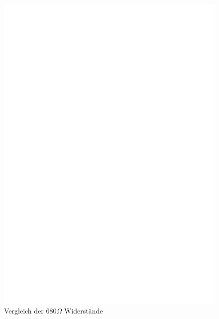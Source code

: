 \begin{enumerate}
\begin{figure}[H]
\centering
\includegraphics[width=17cm]{../FIG/Test2.eps}
\caption{Vergleich der \(680\Omega\) Widerst\"ande }
\label{fig:test2}
\end{figure}


\end{enumerate}

